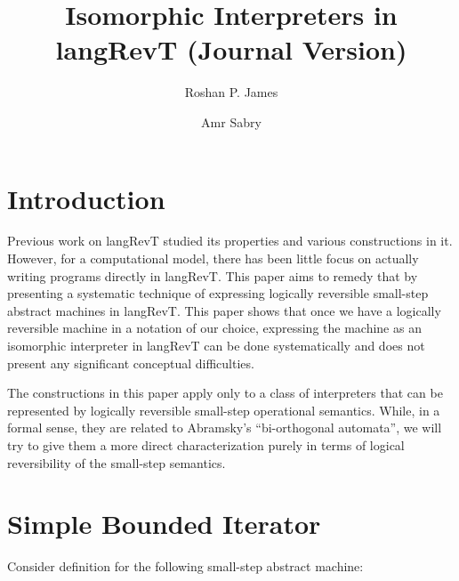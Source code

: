 \documentclass{llncs}
\begin{document}
\title{Isomorphic Interpreters in {{langRevT}} (Journal Version)} 
\author{Roshan P. James \and Amr Sabry}
\maketitle

\begin{abstract}
\end{abstract}

\section{Introduction} 


Previous work on {{langRevT}} \cite{rc2011,infeffects} studied its
properties and various constructions in it. However, for a
computational model, there has been little focus on actually writing
programs directly in {{langRevT}}. This paper aims to remedy that by
presenting a systematic technique of expressing logically reversible
small-step abstract machines in {{langRevT}}. This paper shows that
once we have a logically reversible machine in a notation of our
choice, expressing the machine as an isomorphic interpreter in
{{langRevT}} can be done systematically and does not present any
significant conceptual difficulties.

The constructions in this paper apply only to a class of interpreters
that can be represented by logically reversible small-step operational
semantics. While, in a formal sense, they are related to Abramsky's
``bi-orthogonal automata''\cite{abramsky2005structural}, we will try
to give them a more direct characterization purely in terms of logical
reversibility of the small-step semantics.

\section{Simple Bounded Iterator}
Consider definition for the following small-step abstract machine:

%
\end{document}
